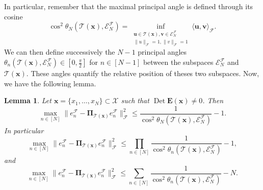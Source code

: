 \documentclass[twoside,11pt]{book}
\newtheorem{lemma}{Lemma}
\numberwithin{theorem}{chapter}
\numberwithin{definition}{chapter}
\numberwithin{proposition}{chapter}
\numberwithin{corollary}{chapter}
\numberwithin{example}{chapter}
\numberwithin{lemma}{chapter}
\numberwithin{assumption}{chapter}
\DeclareMathOperator{\Det}{Det}
\DeclareMathOperator{\F}{\mathcal{F}}
\newcommand{\ab}[1]{\textcolor{red}{#1}}
\begin{document}
In particular, remember that the maximal principal angle is defined through its cosine
\begin{equation}
	\cos^{2} \theta_{N}(\mathcal{T}(\bm{x}),\mathcal{E}^{\mathcal{F}}_{N}) = \inf\limits_{\substack{\bm{u} \in \mathcal{T}(\bm{x}), \bm{v} \in \mathcal{E}^{\mathcal{F}}_{N}\\ \|u\|_{\mathcal{F}} = 1, \|v\|_{\mathcal{F}} = 1}} \langle \bm{u}, \bm{v} \rangle_{\mathcal{F}}.
\end{equation}
We can then define successively the $N-1$ principal angles $\theta_{n}(\mathcal{T}(\bm{x}),\mathcal{E}^{\mathcal{F}}_{N}) \in \left[0, \frac{\pi}{2}\right]$ for $ n\in [N-1]$ between the subspaces $\mathcal{E}^{\mathcal{F}}_{N}$ and $\mathcal{T}(\bm{x})$. These angles quantify the relative position of theses two subspaces. Now, we have the following lemma.







\begin{lemma}\label{lemma:max_error_cos}
Let $\bm{x} = \{x_{1}, \dots , x_{N}\} \subset \mathcal{X}$ such that $\Det \bm{E}(\bm{x}) \neq 0$. Then
\begin{equation}\label{eq:max_error_as_function_of_cos}
	\max_{ n \in [N]} \|e_{n}^{\F} - \bm{\Pi}_{\mathcal{T}(\bm{x})} e_{n}^{\F}\|_{\mathcal{F}}^{2} \leq \frac{1}{\cos^{2} \theta_{N}(\mathcal{T}(\bm{x}),\mathcal{E}^{\mathcal{F}}_{N})} - 1. 
\end{equation}
In particular
\begin{equation}\label{eq:max_error_as_function_of_cos_prod}
\max_{ n \in [N]} \|e_{n}^{\F} - \bm{\Pi}_{\mathcal{T}(\bm{x})} e_{n}^{\F}\|_{\mathcal{F}}^{2} \leq \prod\limits_{n \in [N]}\frac{1}{\cos^{2} \theta_{n}(\mathcal{T}(\bm{x}),\mathcal{E}^{\mathcal{F}}_{N})} - 1,
\end{equation}
and
\begin{equation}\label{eq:max_error_as_function_of_cos_sum}
\max_{ n \in [N]} \|e_{n}^{\F} - \bm{\Pi}_{\mathcal{T}(\bm{x})} e_{n}^{\F}\|_{\mathcal{F}}^{2} \leq \sum\limits_{n \in [N]}\frac{1}{\cos^{2} \theta_{n}(\mathcal{T}(\bm{x}),\mathcal{E}^{\mathcal{F}}_{N})} - N.
\end{equation}
\end{lemma}
\end{document}
